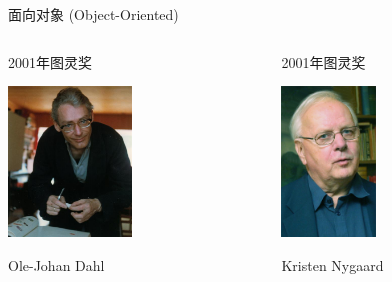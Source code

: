 \documentclass[]{beamer}
\begin{document}
\begin{frame}{面向对象 (Object-Oriented)}
  \begin{columns}
    \begin{column}{.33\textwidth}
      \begin{block}{2001年图灵奖}
        \begin{center}
          \includegraphics[height=4cm]{dahl.jpg}

          Ole-Johan Dahl
        \end{center}
      \end{block}
    \end{column}
    \begin{column}{.33\textwidth}
      \begin{block}{2001年图灵奖}
        \begin{center}
          \includegraphics[height=4cm]{kristen.jpg}

          Kristen Nygaard
        \end{center}
      \end{block}
    \end{column}
  \end{columns}
\end{frame}
\end{document}
